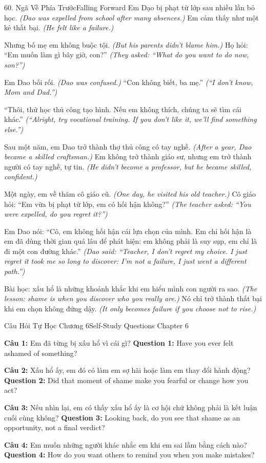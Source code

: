 \begin{truyen}{60. Ngã Về Phía Trước}{Falling Forward}
Em Dạo bị phạt từ lớp sau nhiều lần bỏ học.
\textit{(Dao was expelled from school after many absences.)}
Em cảm thấy như một kẻ thất bại.
\textit{(He felt like a failure.)}

Nhưng bố mẹ em không buộc tội.
\textit{(But his parents didn't blame him.)}
Họ hỏi: ``Em muốn làm gì bây giờ, con?''
\textit{(They asked: ``What do you want to do now, son?'')}

Em Dao bối rối.
\textit{(Dao was confused.)}
``Con không biết, ba mẹ.''
\textit{(``I don't know, Mom and Dad.'')}

``Thôi, thử học thủ công tạo hình. Nếu em không thích, chúng ta sẽ tìm cái khác.''
\textit{(``Alright, try vocational training. If you don't like it, we'll find something else.'')}

Sau một năm, em Dao trở thành thợ thủ công có tay nghề.
\textit{(After a year, Dao became a skilled craftsman.)}
Em không trở thành giáo sư, nhưng em trở thành người có tay nghề, tự tin.
\textit{(He didn't become a professor, but he became skilled, confident.)}

Một ngày, em về thăm cô giáo cũ.
\textit{(One day, he visited his old teacher.)}
Cô giáo hỏi: ``Em vừa bị phạt từ lớp, em có hối hận không?''
\textit{(The teacher asked: ``You were expelled, do you regret it?'')}

Em Dao nói: ``Cô, em không hối hận cái lựa chọn của mình. Em chỉ hối hận là em đã dùng thời gian quá lâu để phát hiện: em không phải là suy sụp, em chỉ là đi một con đường khác.''
\textit{(Dao said: ``Teacher, I don't regret my choice. I just regret it took me so long to discover: I'm not a failure, I just went a different path.'')}

Bài học: xấu hổ là những khoảnh khắc khi em hiểu mình con người ra sao.
\textit{(The lesson: shame is when you discover who you really are.)}
Nó chỉ trở thành thất bại khi em chọn không đứng dậy.
\textit{(It only becomes failure if you choose not to rise.)}
\end{truyen}

\begin{tuhocnhanh}{Câu Hỏi Tự Học Chương 6}{Self-Study Questions Chapter 6}

\textbf{Câu 1:} Em đã từng bị xấu hổ vì cái gì?
\textbf{Question 1:} Have you ever felt ashamed of something?

\textbf{Câu 2:} Xấu hổ ấy, em đó có làm em sợ hãi hoặc làm em thay đổi hành động?
\textbf{Question 2:} Did that moment of shame make you fearful or change how you act?

\textbf{Câu 3:} Nếu nhìn lại, em có thấy xấu hổ ấy là cơ hội chứ không phải là kết luận cuối cùng không?
\textbf{Question 3:} Looking back, do you see that shame as an opportunity, not a final verdict?

\textbf{Câu 4:} Em muốn những người khác nhắc em khi em sai lầm bằng cách nào?
\textbf{Question 4:} How do you want others to remind you when you make mistakes?

\end{tuhocnhanh}

